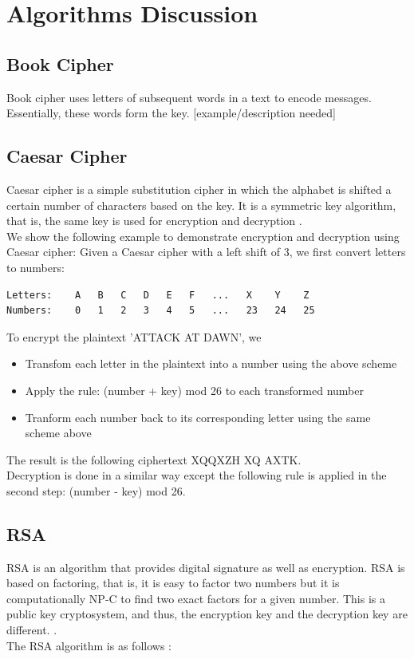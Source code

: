 \documentclass[12pt]{article}
\begin{document}
\section{Algorithms Discussion}
\subsection{Book Cipher}
Book cipher uses letters of subsequent words in a text to encode messages. Essentially, these words form the key. 
[example/description needed]

\subsection{Caesar Cipher}
Caesar cipher is a simple substitution cipher in which the alphabet is shifted a certain number of characters based on the key. It is a symmetric key algorithm, that is, the same key is used for encryption and decryption \cite{busta2002encryption}. \\
We show the following example to demonstrate encryption and decryption using Caesar cipher: 
Given a Caesar cipher with a left shift of 3, we first convert letters to numbers:
\begin{lstlisting}
Letters: 	A   B   C   D   E   F   ...   X    Y    Z
Numbers: 	0   1   2   3   4   5   ...   23   24   25
\end{lstlisting}
To encrypt the plaintext 'ATTACK AT DAWN', we
\begin{itemize}
\item Transfom each letter in the plaintext into a number using the above scheme
\item Apply the rule: (number + key) mod 26 to each transformed number
\item Tranform each number back to its corresponding letter using the same scheme above
\end{itemize}
The result is the following ciphertext XQQXZH XQ AXTK. \\ 
Decryption is done in a similar way except the following rule is applied in the second step: (number - key) mod 26.

\subsection{RSA}
RSA is an algorithm that provides digital signature as well as encryption. RSA is based on factoring, that is, it is easy to factor two numbers but it is computationally NP-C to find two exact factors for a given number. This is a public key cryptosystem, and thus, the encryption key and the decryption key are different. \cite{rsaIntro}. \\
The RSA algorithm is as follows \cite{rsaSteps}:
\end{document}
